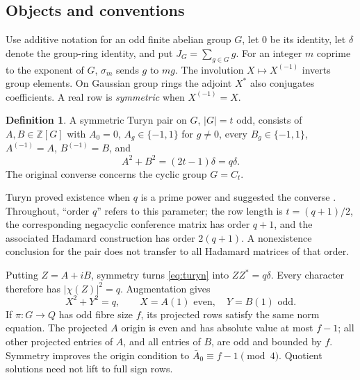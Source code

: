 \documentclass[11pt]{article}
\theoremstyle{definition}
\newtheorem{definition}[theorem]{Definition}
\theoremstyle{remark}
\begin{document}
\subsection{Objects and conventions}
Use additive notation for an odd finite abelian group $G$, let $0$ be its
identity, let $\delta$ denote the group-ring identity, and put
$J_G=\sum_{g\in G}g$. For an integer $m$ coprime to the exponent of $G$,
$\sigma_m$ sends $g$ to $mg$. The involution $X\mapsto X^{(-1)}$ inverts
group elements. On Gaussian group rings the adjoint $X^*$ also conjugates
coefficients. A real row is \emph{symmetric} when $X^{(-1)}=X$.

\begin{definition}
A symmetric Turyn pair on $G$, $|G|=t$ odd, consists of $A,B\in\mathbb Z[G]$
with $A_0=0$, $A_g\in\{-1,1\}$ for $g\ne0$, every $B_g\in\{-1,1\}$,
$A^{(-1)}=A$, $B^{(-1)}=B$, and
\begin{equation}\label{eq:turyn}
 A^2+B^2=(2t-1)\delta=q\delta.
\end{equation}
The original converse concerns the cyclic group $G=C_t$.
\end{definition}
Turyn proved existence when $q$ is a prime power and suggested the converse
\cite{Turyn72}. Throughout, ``order $q$'' refers to this parameter;
the row length is $t=(q+1)/2$, the corresponding negacyclic conference
matrix has order $q+1$, and the associated Hadamard construction has order
$2(q+1)$. A nonexistence conclusion for the pair does not transfer to all
Hadamard matrices of that order.

Putting $Z=A+iB$, symmetry turns \eqref{eq:turyn} into $ZZ^*=q\delta$.
Every character therefore has $|\chi(Z)|^2=q$. Augmentation gives
\begin{equation}\label{eq:augmentation}
 X^2+Y^2=q,\qquad X=A(1)\text{ even},\quad Y=B(1)\text{ odd}.
\end{equation}
If $\pi:G\to Q$ has odd fibre size $f$, its projected rows satisfy the
same norm equation. The projected $A$ origin is even and has absolute
value at most $f-1$; all other projected entries of $A$, and all entries
of $B$, are odd and bounded by $f$. Symmetry improves the origin condition
to $\bar A_0\equiv f-1\pmod4$. Quotient solutions need not lift to full
sign rows.
\end{document}
